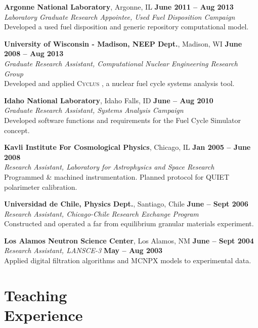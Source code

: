 \documentclass[margin,line]{resume}
\newcommand{\Cyclus}{\textsc{Cyclus }}
\begin{document}
\begin{resume}
    \textbf{Argonne National Laboratory}, Argonne, IL \hfill \textbf{June 2011 -- Aug 2013}\\
		\textsl{Laboratory Graduate Research Appointee, Used Fuel Disposition Campaign}\\ 
		Developed a used fuel disposition and generic repository computational model.

    \textbf{University of Wisconsin - Madison, NEEP Dept.}, Madison, WI \hfill \textbf{June 2008 -- Aug 2013}\\
		\textsl{Graduate Research Assistant, Computational Nuclear Engineering Research Group}\\ 
		Developed and applied \Cyclus, a nuclear fuel cycle systems analysis tool.

    \textbf{Idaho National Laboratory}, Idaho Falls, ID \hfill \textbf{June -- Aug 2010}\\
		\textsl{Graduate Research Assistant, Systems Analysis Campaign}\\ 
		Developed software functions and requirements for the Fuel Cycle Simulator concept.

    \textbf{Kavli Institute For Cosmological Physics}, Chicago, IL \hfill \textbf{Jan 2005 -- June 2008}\\
                \textsl{Research Assistant, Laboratory for Astrophysics and Space Research}\\
                Programmed \& machined instrumentation. Planned protocol for QUIET polarimeter calibration.

    \textbf{Universidad de Chile, Physics Dept.}, Santiago, Chile \hfill \textbf{June -- Sept 2006}\\
                \textsl{Research Assistant, Chicago-Chile Research Exchange Program}\\
                 Constructed and operated a far from equilibrium granular materials experiment.

    \textbf{Los Alamos Neutron Science Center}, Los Alamos, NM \hfill \textbf{June -- Sept 2004}\\ 
                \textsl{Research Assistant, LANSCE-3} \hfill \textbf{May -- Aug 2003}\\
                Applied digital filtration algorithms and MCNPX models to experimental data.
    \pagebreak
    \section{\mysidestyle Teaching\\Experience}


\end{resume}
\end{document}
